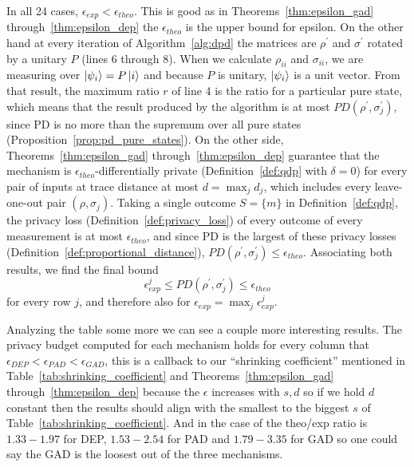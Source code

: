 \documentclass{ieeeaccess}
\begin{document}
In all 24 cases, $\epsilon_{exp} < \epsilon_{theo}$. This is good as in Theorems~\ref{thm:epsilon_gad} through~\ref{thm:epsilon_dep} the $\epsilon_{theo}$ is the upper bound for epsilon. On the other hand at every iteration of Algorithm~\ref{alg:dpd} the matrices are $\rho^{\prime}$ and $\sigma^{\prime}$ rotated by a unitary $P$ (lines 6 through 8). When we calculate $\rho_{ii}$ and $\sigma_{ii}$, we are measuring over $\ket{\psi_i} = P\ket{i}$ and because $P$ is unitary, $\ket{\psi_i}$ is a unit vector. From that result, the maximum ratio $r$ of line 4 is the ratio for a particular pure state, which means that the result produced by the algorithm is at most $PD(\rho^{\prime}, \sigma_{j}^{\prime})$, since PD is no more than the supremum over all pure states (Proposition~\ref{prop:pd_pure_states}). On the other side, Theorems~\ref{thm:epsilon_gad} through~\ref{thm:epsilon_dep} guarantee that the mechanism is $\epsilon_{theo}$-differentially private (Definition~\ref{def:qdp} with $\delta = 0$) for every pair of inputs at trace distance at most $d = \max_j d_j$, which includes every leave-one-out pair $(\rho, \sigma_j)$. Taking a single outcome $S = \{m\}$ in Definition~\ref{def:qdp}, the privacy loss (Definition~\ref{def:privacy_loss}) of every outcome of every measurement is at most $\epsilon_{theo}$, and since PD is the largest of these privacy losses (Definition~\ref{def:proportional_distance}), $PD(\rho^{\prime}, \sigma_{j}^{\prime}) \leq \epsilon_{theo}$. Associating both results, we find the final bound
\begin{equation}
  \epsilon_{exp}^{j} \leq PD(\rho^{\prime}, \sigma_{j}^{\prime}) \leq \epsilon_{theo}
  \label{eq:final_bound}
\end{equation}
for every row $j$, and therefore also for $\epsilon_{exp} = \max_j \epsilon_{exp}^{j}$.

Analyzing the table some more we can see a couple more interesting results. The privacy budget computed for each mechanism holds for every column that $\epsilon_{DEP} < \epsilon_{PAD} < \epsilon_{GAD}$, this is a callback to our ``shrinking coefficient'' mentioned in Table~\ref{tab:shrinking_coefficient} and Theorems~\ref{thm:epsilon_gad} through~\ref{thm:epsilon_dep} because the $\epsilon$ increases with $s, d$ so if we hold $d$ constant then the results should align with the smallest to the biggest $s$ of Table~\ref{tab:shrinking_coefficient}. And in the case of the theo/exp ratio is $1.33 - 1.97$ for DEP, $1.53 - 2.54$ for PAD and $1.79 - 3.35$ for GAD so one could say the GAD is the loosest out of the three mechanisms.
\end{document}
